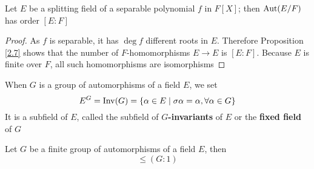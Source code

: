 \documentclass[11pt]{article}
\begin{document}
\begin{proposition}[]
Let \(E\) be a splitting field of a separable polynomial \(f\) in \(F[X]\); then \(\operatorname{\text{Aut}}(E/F)\)
has order \([E:F]\)
\end{proposition}

\begin{proof}
As \(f\) is separable, it has \(\deg f\) different roots in \(E\). Therefore Proposition \ref{2.7}
shows that the number of \(F\)-homomorphisms \(E\to E\) is \([E:F]\). Because \(E\) is finite
over \(F\), all such homomorphisms are isomorphisms
\end{proof}

When \(G\) is a group of automorphisms of a field \(E\), we set
\begin{equation*}
E^G=\operatorname{Inv}(G)=\{\alpha\in E\mid\sigma\alpha=\alpha,\forall\alpha\in G\}
\end{equation*}
It is a subfield of \(E\), called the subfield of \textbf{\(G\)-invariants} of \(E\) or the \textbf{fixed field}
of \(G\)

\begin{theorem}[E. Artin]
Let \(G\) be a finite group of automorphisms of a field \(E\), then
\begin{equation*}
[E:E^G]\le(G:1)
\end{equation*}
\end{theorem}
\end{document}
